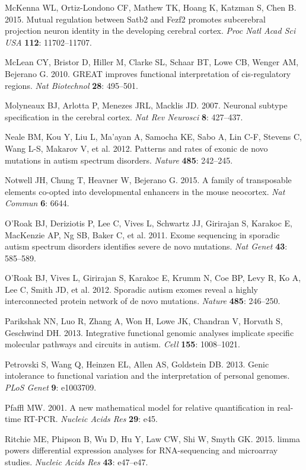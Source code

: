 \documentclass[]{article}
\begin{document}
McKenna WL, Ortiz-Londono CF, Mathew TK, Hoang K, Katzman S, Chen B.
2015. Mutual regulation between Satb2 and Fezf2 promotes subcerebral
projection neuron identity in the developing cerebral cortex. \emph{Proc
Natl Acad Sci USA} \textbf{112}: 11702--11707.

McLean CY, Bristor D, Hiller M, Clarke SL, Schaar BT, Lowe CB, Wenger
AM, Bejerano G. 2010. GREAT improves functional interpretation of
cis-regulatory regions. \emph{Nat Biotechnol} \textbf{28}: 495--501.

Molyneaux BJ, Arlotta P, Menezes JRL, Macklis JD. 2007. Neuronal subtype
specification in the cerebral cortex. \emph{Nat Rev Neurosci}
\textbf{8}: 427--437.

Neale BM, Kou Y, Liu L, Ma'ayan A, Samocha KE, Sabo A, Lin C-F, Stevens
C, Wang L-S, Makarov V, et al. 2012. Patterns and rates of exonic de
novo mutations in autism spectrum disorders. \emph{Nature} \textbf{485}:
242--245.

Notwell JH, Chung T, Heavner W, Bejerano G. 2015. A family of
transposable elements co-opted into developmental enhancers in the mouse
neocortex. \emph{Nat Commun} \textbf{6}: 6644.

O'Roak BJ, Deriziotis P, Lee C, Vives L, Schwartz JJ, Girirajan S,
Karakoc E, MacKenzie AP, Ng SB, Baker C, et al. 2011. Exome sequencing
in sporadic autism spectrum disorders identifies severe de novo
mutations. \emph{Nat Genet} \textbf{43}: 585--589.

O'Roak BJ, Vives L, Girirajan S, Karakoc E, Krumm N, Coe BP, Levy R, Ko
A, Lee C, Smith JD, et al. 2012. Sporadic autism exomes reveal a highly
interconnected protein network of de novo mutations. \emph{Nature}
\textbf{485}: 246--250.

Parikshak NN, Luo R, Zhang A, Won H, Lowe JK, Chandran V, Horvath S,
Geschwind DH. 2013. Integrative functional genomic analyses implicate
specific molecular pathways and circuits in autism. \emph{Cell}
\textbf{155}: 1008--1021.

Petrovski S, Wang Q, Heinzen EL, Allen AS, Goldstein DB. 2013. Genic
intolerance to functional variation and the interpretation of personal
genomes. \emph{PLoS Genet} \textbf{9}: e1003709.

Pfaffl MW. 2001. A new mathematical model for relative quantification in
real-time RT-PCR. \emph{Nucleic Acids Res} \textbf{29}: e45.

Ritchie ME, Phipson B, Wu D, Hu Y, Law CW, Shi W, Smyth GK. 2015. limma
powers differential expression analyses for RNA-sequencing and
microarray studies. \emph{Nucleic Acids Res} \textbf{43}: e47--e47.
\end{document}
